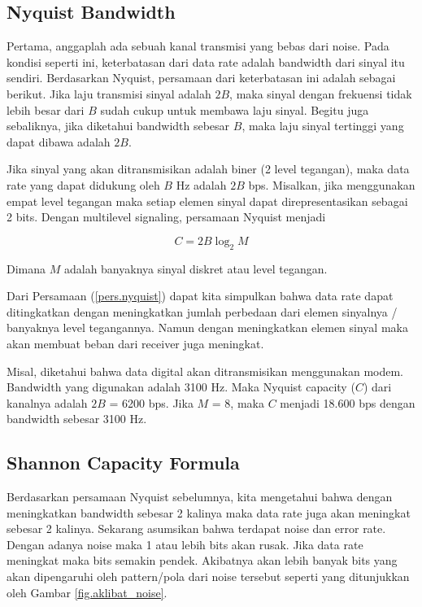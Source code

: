 \subsection{Nyquist Bandwidth}

Pertama, anggaplah ada sebuah kanal transmisi yang bebas dari noise. Pada kondisi seperti ini, keterbatasan dari data rate adalah bandwidth dari sinyal itu sendiri. Berdasarkan Nyquist, persamaan dari keterbatasan ini adalah sebagai berikut. Jika laju transmisi sinyal adalah $ 2B $, maka sinyal dengan frekuensi tidak lebih besar dari $ B $ sudah cukup untuk membawa laju sinyal. Begitu juga sebaliknya, jika diketahui bandwidth sebesar $ B $, maka laju sinyal tertinggi yang dapat dibawa adalah $ 2B $.

Jika sinyal yang akan ditransmisikan adalah biner (2 level tegangan), maka data rate yang dapat didukung oleh $ B $ Hz adalah $ 2B $ bps. Misalkan, jika menggunakan empat level tegangan maka setiap elemen sinyal dapat direpresentasikan sebagai 2 bits. Dengan multilevel signaling, persamaan Nyquist menjadi

\begin{equation} \label{pers.nyquist}
	C = 2B \log_2 M
\end{equation}

Dimana $ M $ adalah banyaknya sinyal diskret atau level tegangan.

Dari Persamaan (\ref{pers.nyquist}) dapat kita simpulkan bahwa data rate dapat ditingkatkan dengan meningkatkan jumlah perbedaan dari elemen sinyalnya / banyaknya level tegangannya. Namun dengan meningkatkan elemen sinyal maka akan membuat beban dari receiver juga meningkat.

Misal, diketahui bahwa data digital akan ditransmisikan menggunakan modem. Bandwidth yang digunakan adalah 3100 Hz. Maka Nyquist capacity ($ C $) dari kanalnya adalah $ 2B $ = 6200 bps. Jika $ M $ = 8, maka $ C $ menjadi 18.600 bps dengan bandwidth sebesar 3100 Hz.

\subsection{Shannon Capacity Formula}

Berdasarkan persamaan Nyquist sebelumnya, kita mengetahui bahwa dengan meningkatkan bandwidth sebesar 2 kalinya maka data rate juga akan meningkat sebesar 2 kalinya. Sekarang asumsikan bahwa terdapat noise dan error rate. Dengan adanya noise maka 1 atau lebih bits akan rusak. Jika data rate meningkat maka bits semakin pendek. Akibatnya akan lebih banyak bits yang akan dipengaruhi oleh pattern/pola dari noise tersebut seperti yang ditunjukkan oleh Gambar \ref{fig.aklibat_noise}.

